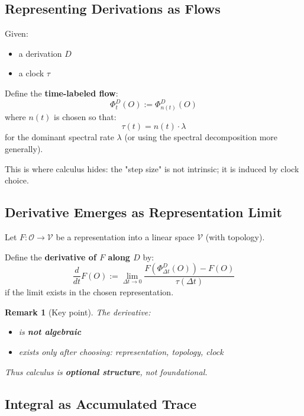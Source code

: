 \documentclass[12pt, oneside]{article}
\newtheorem{remark}[theorem]{Remark}
\newcommand{\Opr}{\mathcal{O}}
\begin{document}
\subsection{Representing Derivations as Flows}

Given:
\begin{itemize}
    \item a derivation $D$
    \item a clock $\tau$
\end{itemize}

Define the \textbf{time-labeled flow}:
\begin{equation}
\Phi_t^D(O) := \Phi_{n(t)}^D(O)
\end{equation}
where $n(t)$ is chosen so that:
\begin{equation}
\tau(t) = n(t) \cdot \lambda
\end{equation}
for the dominant spectral rate $\lambda$ (or using the spectral decomposition more generally).

This is where calculus hides: the "step size" is not intrinsic; it is induced by clock choice.

\subsection{Derivative Emerges as Representation Limit}

Let $F: \Opr \rightarrow \mathcal{V}$ be a representation into a linear space $\mathcal{V}$ (with topology).

Define the \textbf{derivative of $F$ along $D$} by:
\begin{equation}
\frac{d}{dt} F(O) := \lim_{\Delta t \rightarrow 0} \frac{F(\Phi_{\Delta t}^D(O)) - F(O)}{\tau(\Delta t)}
\end{equation}
if the limit exists in the chosen representation.

\begin{remark}[Key point]
The derivative:
\begin{itemize}
    \item is \textbf{not algebraic}
    \item exists only after choosing: representation, topology, clock
\end{itemize}
Thus calculus is \textbf{optional structure}, not foundational.
\end{remark}

\subsection{Integral as Accumulated Trace}
\end{document}
